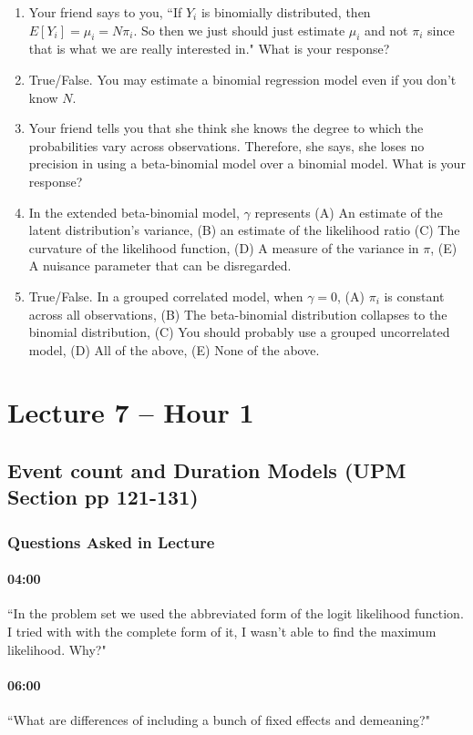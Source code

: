 \documentclass[11pt]{article}
\begin{document}
\begin{enumerate}
\item Your friend says to you, ``If $Y_i$ is binomially distributed, then $E[Y_i] = \mu_i = N\pi_i$. So then we just should just estimate $\mu_i$ and not $\pi_i$ since that is what we are really interested in." What is your response?
\item True/False.  You may estimate a binomial regression model even if you don't know $N$.
\item Your friend tells you that she think she knows the degree to which the probabilities vary across observations. Therefore, she says, she loses no precision in using a beta-binomial model over a binomial model.  What is your response?
\item In the extended beta-binomial model, $\gamma$ represents (A) An estimate of the latent distribution's variance, (B) an estimate of the likelihood ratio (C) The curvature of the likelihood function, (D) A measure of the variance in $\pi$, (E) A nuisance parameter that can be disregarded. 
\item True/False. In a grouped correlated model, when $\gamma = 0$, (A) $\pi_i$ is constant across all observations, (B) The beta-binomial distribution collapses to the binomial distribution, (C) You should probably use a grouped uncorrelated model, (D) All of the above, (E) None of the above.
\end{enumerate}

\section{Lecture 7 -- Hour 1}

\subsection{Event count and Duration  Models (UPM Section pp 121-131)}

\subsubsection{Questions Asked in Lecture}
\paragraph{04:00}``In the  problem set we used the abbreviated form of the logit likelihood function. I tried with  with the complete form of it, I wasn't able to find the maximum likelihood. Why?"
\paragraph{06:00}``What are differences of including a bunch of fixed effects and demeaning?"
\end{document}
